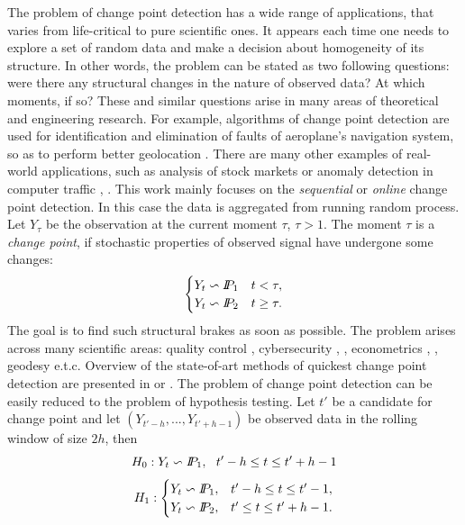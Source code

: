 The problem of change point detection has a wide range of applications, that varies from life-critical to pure scientific ones. It appears each time one needs to explore a set of random data and make a decision about homogeneity of its structure. In other words, the problem can be stated as two following questions: were there any structural changes in the nature of observed data? At which moments, if so? These and similar questions arise in many areas of theoretical and engineering research. For example, algorithms of change point detection are used for identification and elimination of faults of aeroplane's navigation system, so as to perform better geolocation \citet{Nikif}. There are many other examples of real-world applications, such as analysis of stock markets \citet{Lavielle} or anomaly detection in computer traffic \citet{Tartak}, \citet{Casas}. This work mainly focuses on the \textit{sequential} or \textit{online} change point detection. In this case the data is aggregated from running random process. Let $Y_{\tau}$ be the observation at the current moment $\tau$, $\tau > 1$. 
The moment $\tau$ is a \textit{change point}, if stochastic properties of observed signal have undergone some changes: 
\[
\begin{cases}
Y_t \backsim \P_1 & t < \tau, \\ 
Y_t \backsim \P_2 & t \geq \tau. 
\end{cases} 
\]
The goal is to find such structural brakes as soon as possible. The problem arises across many scientific areas: quality control \citet{lai1995sequential}, cybersecurity \citet{Cyber1}, \citet{Cyber2}, econometrics \citet{SpokoinyCP}, \citet{Econom2}, geodesy e.t.c. Overview of the state-of-art methods of quickest change point detection are presented in \citet{ReviewPolun} or \citet{Shiryaev}.
The problem of change point detection can be easily reduced to the problem of hypothesis testing. Let $t'$ be a candidate for change point and let $(Y_{t' - h},..., Y_{t' + h - 1})$ be observed data in the rolling window of size $2h$, then
\[
H_0: Y_t \backsim \P_1, ~~t' - h \leq t \leq t' + h - 1
\]
\[
H_1: \begin{cases}
Y_t \backsim \P_1, & {t' - h } \leq t \leq {t' - 1}, \\ 
Y_t \backsim \P_2, & {t'} \leq t \leq t' + h - 1. 
\end{cases} 
\]
